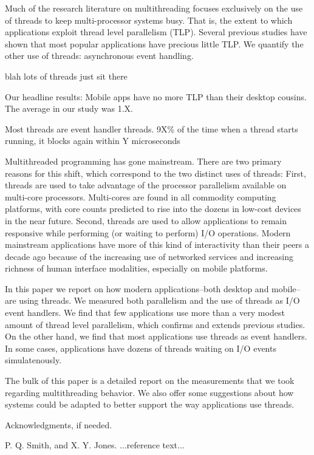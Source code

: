 \documentclass[11pt]{sigplanconf}
\begin{document}
Much of the research literature on multithreading focuses exclusively on
the use of threads to keep multi-processor systems busy.  That is, the
extent to which applications exploit thread level parallelism (TLP).
Several previous studies have shown that most popular applications have
precious little TLP.  We quantify the other use of threads: asynchronous
event handling.

blah lots of threads just sit there

Our headline results: Mobile apps have no more TLP than their desktop
cousins.  The average in our study was 1.X.

Most threads are event handler threads.  9X\% of the time when a thread
starts running, it blocks again within Y microseconds



Multithreaded programming has gone mainstream.  There are two primary
reasons for this shift, which correspond to the two distinct uses of
threads: First, threads are used to take advantage of the processor
parallelism available on multi-core processors.  Multi-cores are found
in all commodity computing platforms, with core counts predicted to rise
into the dozens in low-cost devices in the near future.  Second, threads
are used to allow applications to remain responsive while performing (or
waiting to perform) I/O operations.  Modern mainstream applications have
more of this kind of interactivity than their peers a decade ago because
of the increasing use of networked services and increasing richness of
human interface modalities, especially on mobile platforms.

In this paper we report on how modern applications--both desktop and
mobile--are using threads.  We measured both parallelism and the use of
threads as I/O event handlers.  We find that few applications use more
than a very modest amount of thread level parallelism, which confirms
and extends previous studies.  On the other hand, we find that most
applications use threads as event handlers.  In some cases, applications
have dozens of threads waiting on I/O events simulatenously.

The bulk of this paper is a detailed report on the measurements that we
took regarding multithreading behavior.  We also offer some suggestions
about how systems could be adapted to better support the way
applications use threads.

\acks

Acknowledgments, if needed.





\begin{thebibliography}{}
\softraggedright

P. Q. Smith, and X. Y. Jones. ...reference text...

\end{thebibliography}
\end{document}
